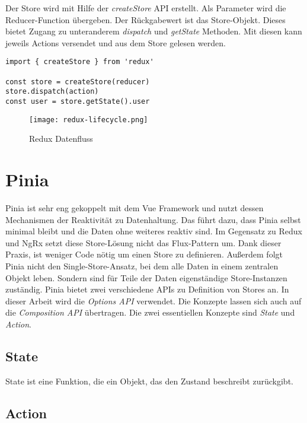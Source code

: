 Der Store wird mit Hilfe der \textit{createStore} API erstellt. Als Parameter wird die Reducer-Function übergeben. Der Rückgabewert ist das Store-Objekt. Dieses bietet Zugang zu unteranderem \textit{dispatch} und \textit{getState} Methoden. Mit diesen kann jeweils Actions versendet und aus dem Store gelesen werden.

\begin{lstlisting}
import { createStore } from 'redux'

const store = createStore(reducer)
store.dispatch(action)
const user = store.getState().user
\end{lstlisting}

\begin{figure}[h!]
  \texttt{[image: redux-lifecycle.png]}
  \caption{Redux Datenfluss}
  \label{fig:redux-lifecycle}
\end{figure}

\section{Pinia}

Pinia ist sehr eng gekoppelt mit dem Vue Framework und nutzt dessen Mechanismen der Reaktivität zu Datenhaltung. Das führt dazu, dass Pinia selbst minimal bleibt und die Daten ohne weiteres reaktiv sind. Im Gegensatz zu Redux und NgRx setzt diese Store-Lösung nicht das Flux-Pattern um. Dank dieser Praxis, ist weniger Code nötig um einen Store zu definieren. Außerdem folgt Pinia nicht den Single-Store-Ansatz, bei dem alle Daten in einem zentralen Objekt leben. Sondern sind für Teile der Daten eigenständige Store-Instanzen zuständig. Pinia bietet zwei verschiedene APIs zu Definition von Stores an. In dieser Arbeit wird die \textit{Options API} verwendet. Die Konzepte lassen sich auch auf die \textit{Composition API} übertragen.\cite{piniaDefiningAStore} Die zwei essentiellen Konzepte sind \textit{State} und \textit{Action}.

\subsection{State}

State ist eine Funktion, die ein Objekt, das den Zustand beschreibt zurückgibt. 

\subsection{Action}


